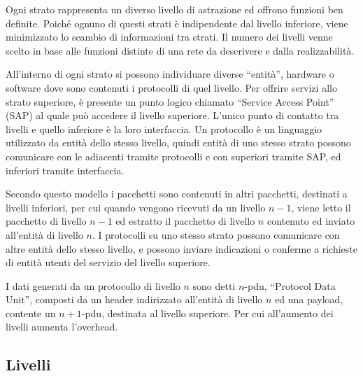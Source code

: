 \documentclass{article}
\numberwithin{equation}{subsection}
\begin{document}

Ogni strato rappresenta un diverso livello di astrazione ed offrono funzioni ben definite. Poiché ognuno di questi strati è indipendente dal livello inferiore, viene minimizzato lo scambio 
di informazioni tra strati. Il numero dei livelli venne scelto in base alle funzioni distinte di una rete da descrivere e dalla realizzabilità. 

All'interno di ogni strato si possono individuare diverse ``entità'', hardware o software dove sono contenuti i protocolli di quel livello. Per offrire servizi allo 
strato superiore, è presente un punto logico chiamato ``Service Access Point'' (SAP) al quale può accedere il livello superiore. 
L'unico punto di contatto tra livelli e quello inferiore è la loro interfaccia. Un protocollo è un linguaggio utilizzato da entità dello stesso livello, quindi entità 
di uno stesso strato possono comunicare con le adiacenti tramite protocolli e con superiori tramite SAP, ed inferiori tramite interfaccia. 

Secondo questo modello i pacchetti sono contenuti in altri pacchetti, destinati a livelli inferiori, per cui quando vengono ricevuti da un livello $n-1$, viene letto 
il pacchetto di livello $n-1$ ed estratto il pacchetto di livello $n$ contenuto ed inviato all'entità di livello $n$. 
I protocolli su uno stesso strato possono comunicare con altre entità dello stesso livello, e possono inviare indicazioni o conferme a richieste di entità utenti del 
servizio del livello superiore. 

I dati generati da un protocollo di livello $n$ sono detti $n$-pdu, ``Protocol Data Unit'', composti da un header indirizzato all'entità di livello $n$ ed una payload, 
contente un $n+1$-pdu, destinata al livello superiore. Per cui all'aumento dei livelli aumenta l'overhead. 

\subsection{Livelli}
\end{document}
